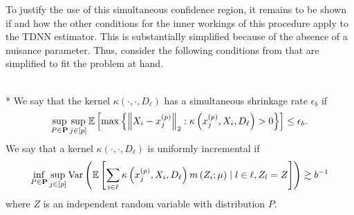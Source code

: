 To justify the use of this simultaneous confidence region, it remains to be shown if and how the other conditions for the inner workings of this procedure apply to the TDNN estimator.
This is substantially simplified because of the absence of a nuisance parameter.
Thus, consider the following conditions from \cite{ritzwoller_simultaneous_2024} that are simplified to fit the problem at hand.

\begin{boxD}
	\begin{dfn}\mbox{}\\*
		We say that the kernel $\kappa\left(\cdot, \cdot, D_{\ell}\right)$ has a simultaneous shrinkage rate $\epsilon_b$ if
		\begin{equation}
			\sup_{P \in \mathbf{P}} \sup_{j \in[p]}
			\mathbb{E}\left[\max \left\{\left\|X_{i}-x^{(p)}_{j}\right\|_{2}: \kappa\left(x^{(p)}_{j}, X_{i}, D_{\ell}\right)>0\right\}\right]
			\leq \epsilon_b .
		\end{equation}
		We say that a kernel $\kappa\left(\cdot, \cdot, D_{\ell}\right)$ is uniformly incremental if
		\begin{equation}
			\inf_{P \in \mathbf{P}} \sup_{j \in[p]}
			\text{Var}\left(\mathbb{E}\left[\sum_{i \in \ell} \kappa\left(x^{(p)}_{j}, X_{i}, D_{\ell}\right) m\left(Z_{i} ; \mu\right) \mid l \in \ell, Z_l = Z\right]\right)
			\gtrsim b^{-1}
		\end{equation}
		where $Z$ is an independent random variable with distribution $P$.
	\end{dfn}
\end{boxD}

